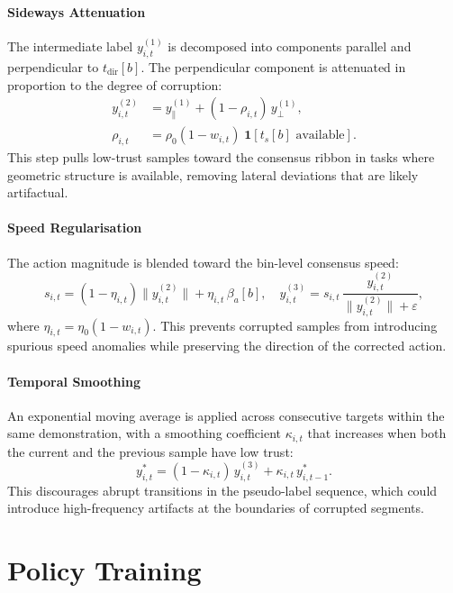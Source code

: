 \documentclass[a4paper, 10pt, conference]{ieeeconf}
\begin{document}
\paragraph{Sideways Attenuation}
The intermediate label $y^{(1)}_{i,t}$ is decomposed into components parallel and perpendicular to $t_{\mathrm{dir}}[b]$.
The perpendicular component is attenuated in proportion to the degree of corruption:
\begin{equation}
    \begin{aligned}
        y^{(2)}_{i,t} &= y^{(1)}_\parallel + (1 - \rho_{i,t})\, y^{(1)}_\perp,\\
        \rho_{i,t} &= \rho_0(1-w_{i,t})\;\mathbf{1}[t_s[b]\text{ available}].
    \end{aligned}
\end{equation}
This step pulls low-trust samples toward the consensus ribbon in tasks where geometric structure is available, removing lateral deviations that are likely artifactual.

\paragraph{Speed Regularisation}
The action magnitude is blended toward the bin-level consensus speed:
\begin{equation}
    s_{i,t} = (1-\eta_{i,t})\|y^{(2)}_{i,t}\| + \eta_{i,t}\,\beta_a[b],
    \quad y^{(3)}_{i,t} = s_{i,t}\,\frac{y^{(2)}_{i,t}}{\|y^{(2)}_{i,t}\|+\varepsilon},
\end{equation}
where $\eta_{i,t} = \eta_0(1-w_{i,t})$.
This prevents corrupted samples from introducing spurious speed anomalies while preserving the direction of the corrected action.

\paragraph{Temporal Smoothing}
An exponential moving average is applied across consecutive targets within the same demonstration, with a smoothing coefficient $\kappa_{i,t}$ that increases when both the current and the previous sample have low trust:
\begin{equation}
    y^*_{i,t} = (1-\kappa_{i,t})\, y^{(3)}_{i,t} + \kappa_{i,t}\, y^*_{i,t-1}.
\end{equation}
This discourages abrupt transitions in the pseudo-label sequence, which could introduce high-frequency artifacts at the boundaries of corrupted segments.

\section{Policy Training}
\end{document}
